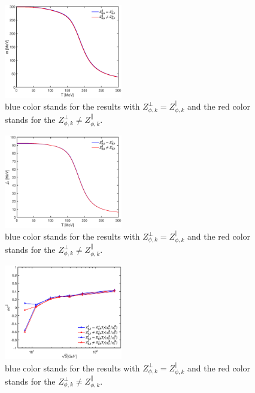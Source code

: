 \documentclass[%
reprint,
superscriptaddress,
showpacs,preprintnumbers,
 amsmath,amssymb,
 aps,
prd,
]{revtex4-1}
\begin{document}
\begin{figure}[t]
\includegraphics[width=0.46\textwidth]{mf.eps}
\caption{blue color stands for the results with $Z^{\bot}_{\phi,k}=Z^{\|}_{\phi,k}$ and the red color stands for the $Z^{\bot}
_{\phi,k}\neq Z^{\|}_{\phi,k} $.}
\label{fig:mf}
\end{figure}


\begin{figure}[t]
\includegraphics[width=0.46\textwidth]{fpi.eps}
\caption{blue color stands for the results with $Z^{\bot}_{\phi,k}=Z^{\|}_{\phi,k}$ and the red color stands for the $Z^{\bot}
_{\phi,k}\neq Z^{\|}_{\phi,k} $.}
\label{fig:fpi}
\end{figure}

\begin{figure}[t]
\includegraphics[width=0.46\textwidth]{freeze.eps}
\caption{blue color stands for the results with $Z^{\bot}_{\phi,k}=Z^{\|}_{\phi,k}$ and the red color stands for the $Z^{\bot}
_{\phi,k}\neq Z^{\|}_{\phi,k} $.}
\label{fig:freeze}
\end{figure}
\end{document}
